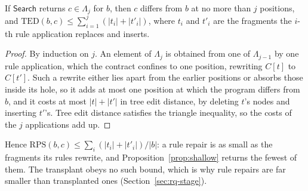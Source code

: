 \documentclass[acmsmall,screen,review,anonymous,nonacm]{acmart}
\newcommand{\aux}[1]{\ensuremath{\mathsf{#1}}}
\newcommand{\RPS}{\mathrm{RPS}}
\begin{document}
\begin{theorem}[Locality]\label{thm:local}
If \aux{Search} returns $c \in \Lambda_j$ for $b$, then $c$ differs from $b$ at no more than $j$ positions, and $\mathrm{TED}(b, c) \le \sum_{i=1}^{j} (|t_i| + |t'_i|)$, where $t_i$ and $t'_i$ are the fragments the $i$-th rule application replaces and inserts.
\end{theorem}
\begin{proof}
By induction on $j$. An element of $\Lambda_j$ is obtained from one of $\Lambda_{j-1}$ by one rule application, which the contract confines to one position, rewriting $C[t]$ to $C[t']$. Such a rewrite either lies apart from the earlier positions or absorbs those inside its hole, so it adds at most one position at which the program differs from $b$, and it costs at most $|t| + |t'|$ in tree edit distance, by deleting $t$'s nodes and inserting $t'$'s. Tree edit distance satisfies the triangle inequality, so the costs of the $j$ applications add up.
\end{proof}
Hence $\RPS(b, c) \le \sum_{i} (|t_i| + |t'_i|) / |b|$: a rule repair is as small as the fragments its rules rewrite, and Proposition~\ref{prop:shallow} returns the fewest of them. The transplant obeys no such bound, which is why rule repairs are far smaller than transplanted ones (Section~\ref{sec:rq-stage}).
\end{document}

